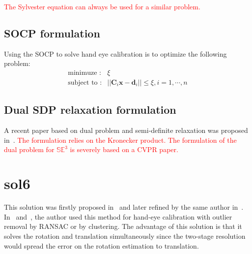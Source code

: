 \textcolor{red}{The Sylvester equation can always be used for a similar problem.}

\subsection{SOCP formulation}
Using the SOCP to solve hand eye calibration is to optimize the following problem:
\begin{align}
\text{minimuze :}& \xi \\
\text{subject to :}& ||\mathbf{C}_i\mathbf{x}-\mathbf{d}_i|| \leq \xi, \text{$i=1, \cdots, n$} \nonumber
\end{align}

\subsection{Dual SDP relaxation formulation}
A recent paper based on dual problem and semi-definite relaxation was proposed in~\cite{2018_Giamou_Certifiably}. \textcolor{red}{The formulation relies on the Kronecker product. The formulation of the dual problem for $\mathbb{SE}^3$ is severely based on a CVPR paper.}

\section{sol6}
This solution was firstly proposed in~\cite{daniilidis1996dual} and later refined by the same author in~\cite{daniilidis1999hand}. In~\cite{schmidt2003robust} and~\cite{vogt2004vector}, the author used this method for hand-eye calibration with outlier removal by RANSAC or by clustering. The advantage of this solution is that it solves the rotation and translation simultaneously since the two-stage resolution would spread the error on the rotation estimation to translation.
